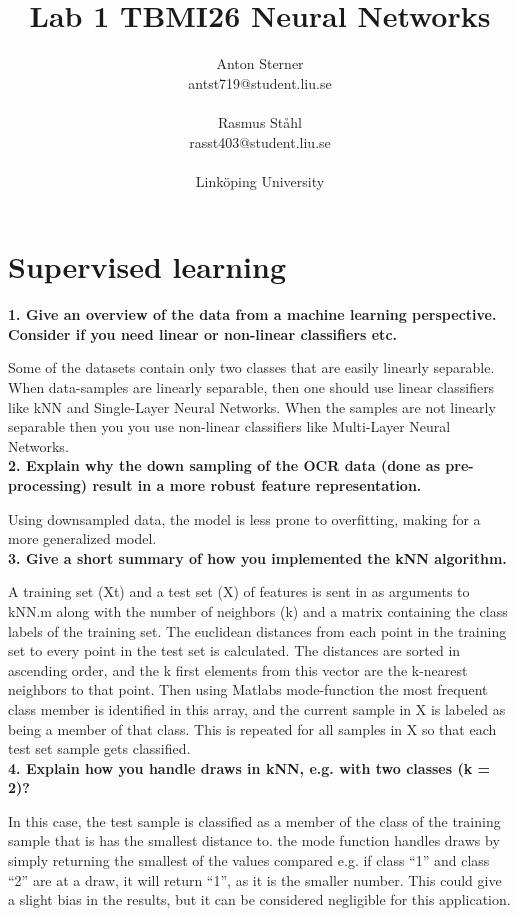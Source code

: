 \documentclass[twocolumn]{report}
\title{Lab 1 TBMI26 Neural Networks}
\author{Anton Sterner\\ antst719@student.liu.se\\ \\ Rasmus Ståhl\\ rasst403@student.liu.se\\ \\ Linköping University}
\begin{document}
	\maketitle
	
	\newpage
	\chapter{Supervised learning}
	
	\textbf{1. Give an overview of the data from a machine learning perspective. Consider if you need linear or non-linear classifiers etc.}
	
	
	Some of the datasets contain only two classes that are easily linearly separable. When data-samples are linearly separable, then one should use linear classifiers like kNN and Single-Layer Neural Networks. When the samples are not linearly separable then you you use non-linear classifiers like Multi-Layer Neural Networks. \\
	
	\textbf{2. Explain why the down sampling of the OCR data (done as pre-processing) result in a more robust feature representation.}
	
	Using downsampled data, the model is less prone to overfitting, making for a more generalized model. \\
	
	\textbf{3. Give a short summary of how you implemented the kNN algorithm.  }
	
	A training set (Xt) and a test set (X) of features is sent in as arguments to kNN.m along with the number of neighbors (k) and a matrix containing the class labels of the training set. The euclidean distances from each point in the training set to every point in the test set is calculated.  The distances are sorted in ascending order, and the k first elements from this vector are the k-nearest neighbors to that point. Then using Matlabs mode-function the most frequent class member is identified in this array, and the current sample in X is labeled as being a member of that class. This is repeated for all samples in X so that each test set sample gets classified. \\
	
	\textbf{4. Explain how you handle draws in kNN, e.g. with two classes (k = 2)?}
	
	In this case, the test sample is classified as a member of the class of the training sample that is has the smallest distance to. the mode function handles draws by simply returning the smallest of the values compared e.g. if class “1” and class “2” are at a draw, it will return “1”, as it is the smaller number. This could give a slight bias in the results, but it can be considered negligible for this application. 
	
\end{document}
